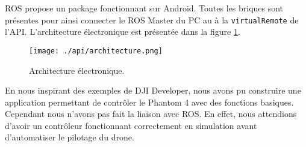 ROS propose un package fonctionnant sur Android. Toutes les briques sont présentes
pour ainsi connecter le ROS Master du PC au à la \texttt{virtualRemote} de l’API. L’architecture
électronique est présentée dans la figure \ref{fig:architecture}.

\begin{figure}[!htb]
    \centering
    \texttt{[image: ./api/architecture.png]}
    \caption{Architecture électronique.}
    \label{fig:architecture}
\end{figure}


En nous inspirant des exemples de DJI Developer, nous avons pu construire une
application permettant de contrôler le Phantom 4 avec des fonctions basiques.
Cependant nous n’avons pas fait la liaison avec ROS. En effet, nous attendions d’avoir
un contrôleur fonctionnant correctement en simulation avant d’automatiser le pilotage
du drone.

